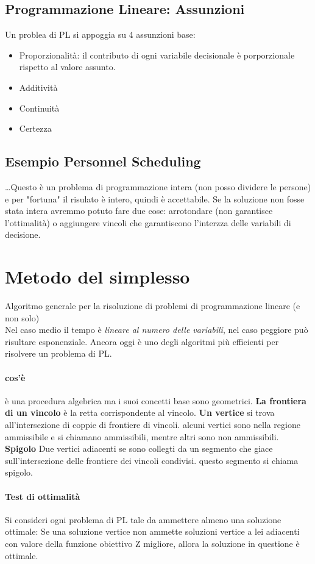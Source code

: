 \documentclass[12pt, a4paper, openany]{book}
\begin{document}
\subsection*{Programmazione Lineare: Assunzioni}
Un problea di PL si appoggia su 4 assunzioni base:
\begin{itemize}
    \item Proporzionalità: il contributo di ogni variabile decisionale è porporzionale rispetto al valore assunto.
    \item Additività
    \item Continuità
    \item Certezza
\end{itemize}

\subsection*{Esempio Personnel Scheduling}
\dots Questo è un problema di programmazione intera (non posso dividere le persone) e per "fortuna" il risulato è intero, quindi è accettabile.
Se la soluzione non fosse stata intera avremmo potuto fare due cose: arrotondare (non garantisce l'ottimalità) o aggiungere vincoli che garantiscono l'interzza delle variabili di decisione.

\section*{Metodo del simplesso}
Algoritmo generale per la risoluzione di problemi di programmazione lineare (e non solo)
\\Nel caso medio il tempo è \emph{lineare al numero delle variabili}, nel caso peggiore può risultare esponenziale.
Ancora oggi è uno degli algoritmi più efficienti per risolvere un problema di PL.

\paragraph*{cos'è} è una procedura algebrica ma i suoi concetti base sono geometrici.
\textbf{La frontiera di un vincolo} è la retta corrispondente al vincolo.
\textbf{Un vertice} si trova all'intersezione di coppie di frontiere di vincoli.
alcuni vertici sono nella regione ammissibile e si chiamano ammissibili, mentre altri sono non ammissibili.
\textbf{Spigolo} Due vertici adiacenti se sono collegti da un segmento che giace sull'intersezione delle frontiere dei vincoli condivisi.
questo segmento si chiama spigolo.
\paragraph*{Test di ottimalità} Si consideri ogni problema di PL tale da ammettere almeno una soluzione ottimale:
Se una soluzione vertice non ammette soluzioni vertice a lei adiacenti con valore della funzione obiettivo Z migliore, allora la soluzione in questione è ottimale.
\end{document}
